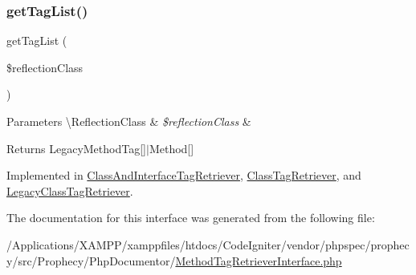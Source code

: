 \subsubsection{\texorpdfstring{get\+Tag\+List()}{getTagList()}}
{\footnotesize\ttfamily get\+Tag\+List (\begin{DoxyParamCaption}\item[{\textbackslash{}Reflection\+Class}]{\$reflection\+Class }\end{DoxyParamCaption})}


\begin{DoxyParams}[1]{Parameters}
\textbackslash{}\+Reflection\+Class & {\em \$reflection\+Class} & \\
\hline
\end{DoxyParams}
\begin{DoxyReturn}{Returns}
Legacy\+Method\+Tag\mbox{[}\mbox{]}$\vert$\+Method\mbox{[}\mbox{]} 
\end{DoxyReturn}


Implemented in \mbox{\hyperlink{class_prophecy_1_1_php_documentor_1_1_class_and_interface_tag_retriever_a2eb68ce00dcc84a156b9a2b7844a5e6f}{Class\+And\+Interface\+Tag\+Retriever}}, \mbox{\hyperlink{class_prophecy_1_1_php_documentor_1_1_class_tag_retriever_a2eb68ce00dcc84a156b9a2b7844a5e6f}{Class\+Tag\+Retriever}}, and \mbox{\hyperlink{class_prophecy_1_1_php_documentor_1_1_legacy_class_tag_retriever_a2eb68ce00dcc84a156b9a2b7844a5e6f}{Legacy\+Class\+Tag\+Retriever}}.



The documentation for this interface was generated from the following file\+:\begin{DoxyCompactItemize}
\item 
/\+Applications/\+X\+A\+M\+P\+P/xamppfiles/htdocs/\+Code\+Igniter/vendor/phpspec/prophecy/src/\+Prophecy/\+Php\+Documentor/\mbox{\hyperlink{_method_tag_retriever_interface_8php}{Method\+Tag\+Retriever\+Interface.\+php}}\end{DoxyCompactItemize}
